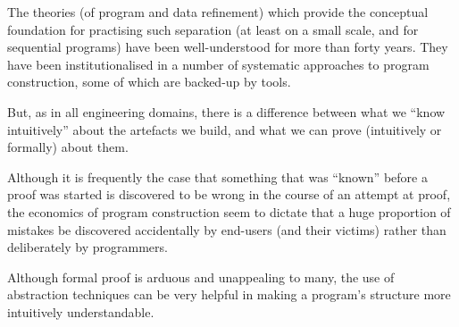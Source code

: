 \documentclass{ip3}
\begin{document}
\begin{foil}
\begin{note}[]
The theories (of program and data refinement) which provide
the conceptual foundation for practising such separation
(at least on a small scale, and for sequential programs)
have been well-understood for more than forty years. They have
been institutionalised in a number of systematic approaches
to program construction, some of which are backed-up by
tools. 

But, as in all engineering domains, there is a difference
between what we  ``know intuitively''  about the artefacts
we build, and what we can prove (intuitively or formally) about them.

Although it is frequently the case that something that was
``known'' before a proof was started is  discovered to
be wrong in the course of an attempt at proof, the economics of program
construction seem to dictate that a huge proportion of mistakes
be discovered accidentally by end-users (and their victims)
rather than deliberately by programmers.

Although formal proof is arduous and unappealing to many, the use of
abstraction techniques can be very helpful in making
a program's structure more intuitively understandable.
\end{note}
\end{foil}
\end{document}
